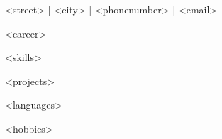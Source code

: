 \documentclass[12pt]{article}
\begin{document}

    \begin{center}
    {
        \small\bodyfont
        \faEnvelopeO\/ <street> | \faMapMarker\/ <city> | \faPhone\/ <phonenumber> |\faAt\protect\/ <email>
    }
    \end{center}


    \setlength{\parskip}{\baselineskip}
    \setlength{\parindent}{2pt}

<career>

<skills>

<projects>

<languages>

<hobbies>
\end{document}
